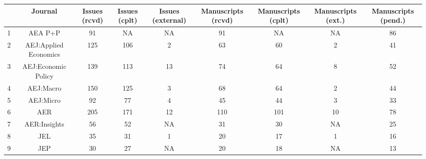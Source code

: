 
\begin{tabular}{@{\extracolsep{5pt}} ccccccccc} 
\toprule 
 & Journal & Issues (rcvd) & Issues (cplt) & Issues (external) & Manuscripts (rcvd) & Manuscripts (cplt) & Manuscripts (ext.) & Manuscripts (pend.) \\ 
\midrule 1 & AEA P+P & 91 & NA & NA & 91 & NA & NA & 86 \\ 
2 & AEJ:Applied Economics & 125 & 106 & 2 & 63 & 60 & 2 & 41 \\ 
3 & AEJ:Economic Policy & 139 & 113 & 13 & 74 & 64 & 8 & 52 \\ 
4 & AEJ:Macro & 150 & 125 & 3 & 68 & 64 & 2 & 44 \\ 
5 & AEJ:Micro & 92 & 77 & 4 & 45 & 44 & 3 & 33 \\ 
6 & AER & 205 & 171 & 12 & 110 & 101 & 10 & 78 \\ 
7 & AER:Insights & 56 & 52 & NA & 31 & 30 & NA & 25 \\ 
8 & JEL & 35 & 31 & 1 & 20 & 17 & 1 & 16 \\ 
9 & JEP & 30 & 27 & NA & 20 & 18 & NA & 13 \\ 
\bottomrule 
\end{tabular} 
